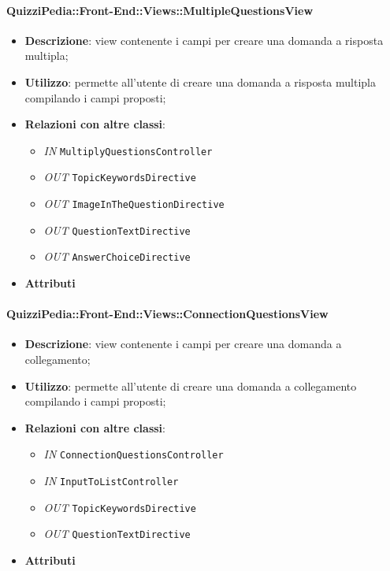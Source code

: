 \paragraph{QuizziPedia::Front-End::Views::MultipleQuestionsView}
\begin{itemize}
	\item \textbf{Descrizione}: view contenente i campi per creare una domanda a risposta multipla;
	\item \textbf{Utilizzo}: permette all'utente di creare una domanda a risposta multipla compilando i campi proposti;
	\item \textbf{Relazioni con altre classi}:
		\begin{itemize}
			\item \textit{IN} \texttt{MultiplyQuestionsController} \\
			\item \textit{OUT} \texttt{TopicKeywordsDirective} \\
			\item \textit{OUT} \texttt{ImageInTheQuestionDirective} \\
			\item \textit{OUT} \texttt{QuestionTextDirective} \\
			\item \textit{OUT} \texttt{AnswerChoiceDirective} \\   
		\end{itemize}
	\item \textbf{Attributi}
\end{itemize}

\paragraph{QuizziPedia::Front-End::Views::ConnectionQuestionsView}
\begin{itemize}
	\item \textbf{Descrizione}: view contenente i campi per creare una domanda a collegamento;
	\item \textbf{Utilizzo}: permette all'utente di creare una domanda a collegamento compilando i campi proposti;
	\item \textbf{Relazioni con altre classi}:
	\begin{itemize}
		\item \textit{IN} \texttt{ConnectionQuestionsController} \\
		\item \textit{IN} \texttt{InputToListController} \\
		\item \textit{OUT} \texttt{TopicKeywordsDirective} \\
		\item \textit{OUT} \texttt{QuestionTextDirective} \\ 
	\end{itemize}
	\item \textbf{Attributi}
\end{itemize}

